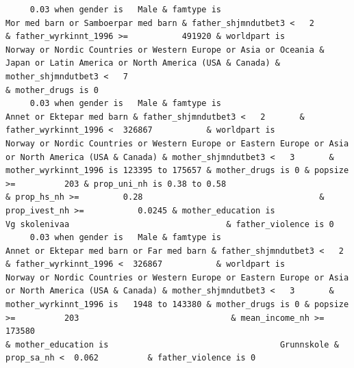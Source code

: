\documentclass[
  letterpaper,
  DIV=11,
  numbers=noendperiod]{scrreprt}
\begin{document}
\begin{verbatim}
     0.03 when gender is   Male & famtype is                              Mor med barn or Samboerpar med barn & father_shjmndutbet3 <   2       & father_wyrkinnt_1996 >=           491920 & worldpart is            Norway or Nordic Countries or Western Europe or Asia or Oceania & Japan or Latin America or North America (USA & Canada) & mother_shjmndutbet3 <   7                                                  & mother_drugs is 0                                                                                                                                                                                                                                                                                                                                                                                                                                         
     0.03 when gender is   Male & famtype is                                        Annet or Ektepar med barn & father_shjmndutbet3 <   2       & father_wyrkinnt_1996 <  326867           & worldpart is                              Norway or Nordic Countries or Western Europe or Eastern Europe or Asia or North America (USA & Canada) & mother_shjmndutbet3 <   3       & mother_wyrkinnt_1996 is 123395 to 175657 & mother_drugs is 0 & popsize >=          203 & prop_uni_nh is 0.38 to 0.58                                      & prop_hs_nh >=         0.28                                    & prop_ivest_nh >=           0.0245 & mother_education is                                Vg skolenivaa                                & father_violence is 0                                                                                                               
     0.03 when gender is   Male & famtype is                        Annet or Ektepar med barn or Far med barn & father_shjmndutbet3 <   2       & father_wyrkinnt_1996 <  326867           & worldpart is                              Norway or Nordic Countries or Western Europe or Eastern Europe or Asia or North America (USA & Canada) & mother_shjmndutbet3 <   3       & mother_wyrkinnt_1996 is   1948 to 143380 & mother_drugs is 0 & popsize >=          203                               & mean_income_nh >=           173580                                                                                                     & mother_education is                                   Grunnskole & prop_sa_nh <  0.062          & father_violence is 0                                                                                                               

\end{verbatim}
\end{document}
